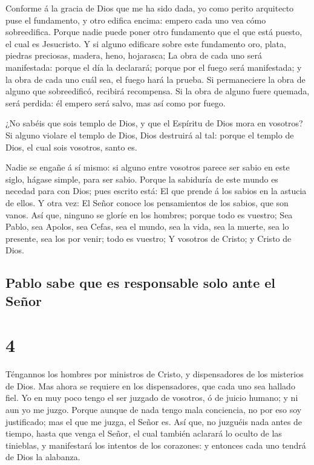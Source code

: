  Conforme á la gracia de Dios que me ha sido dada, yo
como perito arquitecto puse el fundamento, y otro edifica encima: empero
cada uno vea cómo sobreedifica.  Porque nadie puede poner
otro fundamento que el que está puesto, el cual es Jesucristo.
 Y si alguno edificare sobre este fundamento oro, plata,
piedras preciosas, madera, heno, hojarasca;  La obra de
cada uno será manifestada: porque el día la declarará; porque por el
fuego será manifestada; y la obra de cada uno cuál sea, el fuego hará la
prueba.  Si permaneciere la obra de alguno que
sobreedificó, recibirá recompensa.  Si la obra de alguno
fuere quemada, será perdida: él empero será salvo, mas así como por
fuego.

 ¿No sabéis que sois templo de Dios, y que el Espíritu de
Dios mora en vosotros?  Si alguno violare el templo de
Dios, Dios destruirá al tal: porque el templo de Dios, el cual sois
vosotros, santo es.

 Nadie se engañe á sí mismo: si alguno entre vosotros
parece ser sabio en este siglo, hágase simple, para ser sabio.
 Porque la sabiduría de este mundo es necedad para con
Dios; pues escrito está: El que prende á los sabios en la astucia de
ellos.  Y otra vez: El Señor conoce los pensamientos de
los sabios, que son vanos.  Así que, ninguno se gloríe en
los hombres; porque todo es vuestro;  Sea Pablo, sea
Apolos, sea Cefas, sea el mundo, sea la vida, sea la muerte, sea lo
presente, sea los por venir; todo es vuestro;  Y vosotros
de Cristo; y Cristo de Dios.

\hypertarget{pablo-sabe-que-es-responsable-solo-ante-el-seuxf1or}{%
\subsection{Pablo sabe que es responsable solo ante el
Señor}\label{pablo-sabe-que-es-responsable-solo-ante-el-seuxf1or}}

\hypertarget{section-46-4}{%
\section{4}\label{section-46-4}}

 Téngannos los hombres por ministros de Cristo, y
dispensadores de los misterios de Dios.  Mas ahora se
requiere en los dispensadores, que cada uno sea hallado fiel.
 Yo en muy poco tengo el ser juzgado de vosotros, ó de
juicio humano; y ni aun yo me juzgo.  Porque aunque de
nada tengo mala conciencia, no por eso soy justificado; mas el que me
juzga, el Señor es.  Así que, no juzguéis nada antes de
tiempo, hasta que venga el Señor, el cual también aclarará lo oculto de
las tinieblas, y manifestará los intentos de los corazones: y entonces
cada uno tendrá de Dios la alabanza.

